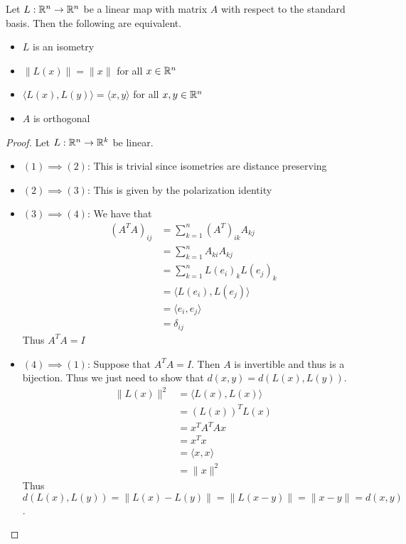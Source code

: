 \documentclass[a4paper]{article}
\begin{document}
\begin{prp}{}{} Let $L:\mathbb{R}^n\to\mathbb{R}^n$ be a linear map with matrix $A$ with respect to the standard basis. Then the following are equivalent. 
\begin{itemize}
\item $L$ is an isometry
\item $\|L(x)\|=\|x\|$ for all $x\in\mathbb{R}^n$
\item $\langle L(x),L(y)\rangle=\langle x,y\rangle$ for all $x,y\in\mathbb{R}^n$
\item $A$ is orthogonal
\end{itemize}\tcbline
\begin{proof} Let $L:\mathbb{R}^n\to\mathbb{R}^k$ be linear. 
\begin{itemize}
\item $(1)\implies(2)$: This is trivial since isometries are distance preserving
\item $(2)\implies(3)$: This is given by the polarization identity
\item $(3)\implies(4)$: We have that  
\begin{align*}
\left(A^TA\right)_{ij}&=\sum_{k=1}^n(A^T)_{ik}A_{kj}\\
&=\sum_{k=1}^nA_{ki}A_{kj}\\
&=\sum_{k=1}^nL(e_i)_kL(e_j)_k\\
&=\langle L(e_i),L(e_j)\rangle\\
&=\langle e_i,e_j\rangle\tag{By $(3)$}\\
&=\delta_{ij}
\end{align*} Thus $A^TA=I$
\item $(4)\implies(1)$: Suppose that $A^TA=I$. Then $A$ is invertible and thus is a bijection. Thus we just need to show that $d(x,y)=d(L(x),L(y))$.
\begin{align*}
\|L(x)\|^2&=\langle L(x),L(x)\rangle\\
&=(L(x))^TL(x)\\
&=x^TA^TAx\\
&=x^Tx\\
&=\langle x,x\rangle\\
&=\|x\|^2
\end{align*}
Thus $d(L(x),L(y))=\|L(x)-L(y)\|=\|L(x-y)\|=\|x-y\|=d(x,y)$. 
\end{itemize}
\end{proof}
\end{prp}
\end{document}
